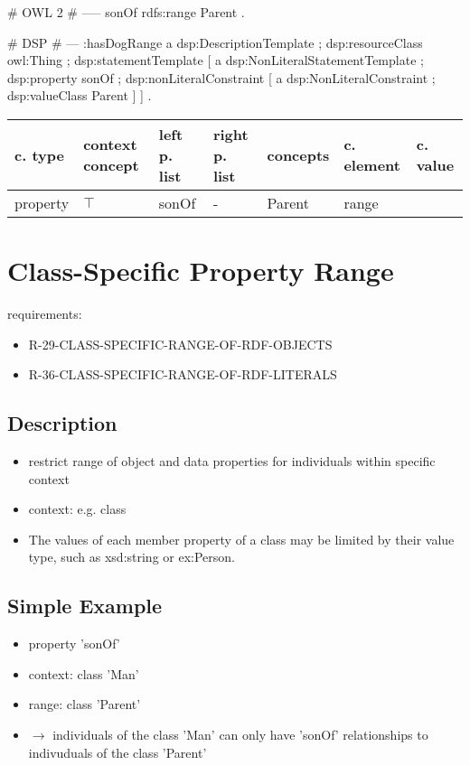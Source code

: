 \documentclass{llncs}
\newenvironment{gcotable}{
  \scriptsize
  \sffamily
  \vspace{0.3cm}
  \begin{tabular}{l|l|l|l|l|l|l}
  \hline
  \textbf{c. type} & \textbf{context concept} & \textbf{left p. list} & \textbf{right p. list} & \textbf{concepts} & \textbf{c. element} & \textbf{c. value} \\
  \hline

}{
  \hline
  \end{tabular}
  \linebreak
}
\begin{document}
\begin{ex}
# OWL 2
# -----
sonOf rdfs:range Parent . 
\end{ex}

\begin{ex}
# DSP
# ---
:hasDogRange
        a dsp:DescriptionTemplate ; 
        dsp:resourceClass owl:Thing ; 
        dsp:statementTemplate [
            a dsp:NonLiteralStatementTemplate ;
            dsp:property sonOf ; 
            dsp:nonLiteralConstraint [ 
                a dsp:NonLiteralConstraint ;
                dsp:valueClass Parent ] ] .
\end{ex}

\begin{gcotable}
property & $\top$ & sonOf & - & Parent & range \\
\end{gcotable}

\section{Class-Specific Property Range}

requirements:

\begin{itemize}
	\item R-29-CLASS-SPECIFIC-RANGE-OF-RDF-OBJECTS
	\item R-36-CLASS-SPECIFIC-RANGE-OF-RDF-LITERALS
\end{itemize}

\subsection{Description}

\begin{itemize}
  \item restrict range of object and data properties for individuals within specific context
	\item context: e.g. class
	\item The values of each member property of a class may be limited by their value type, such as xsd:string or ex:Person. 
\end{itemize}

\subsection{Simple Example}

\begin{itemize}
	\item property 'sonOf'
	\item context: class 'Man'
	\item range: class 'Parent'
	\item $\rightarrow$ individuals of the class 'Man' can only have 'sonOf' relationships to indivuduals of the class 'Parent'
\end{itemize}
\end{document}
